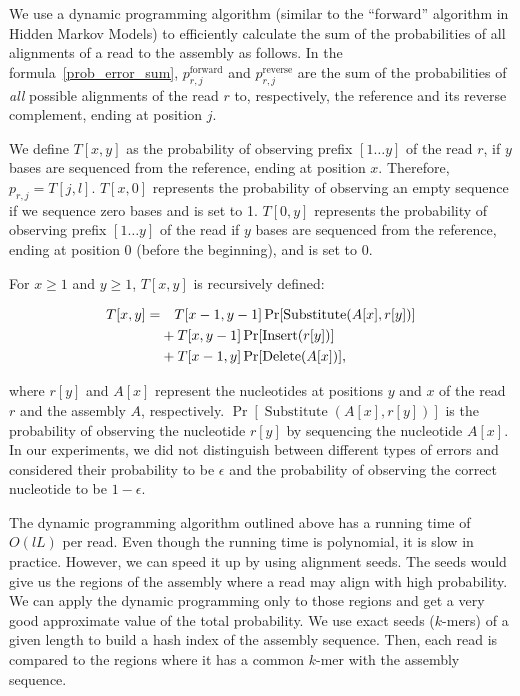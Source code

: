We use a dynamic programming algorithm (similar to the ``forward''
algorithm in Hidden Markov Models) to efficiently calculate the sum of the
probabilities of all alignments of a read to the assembly as follows.
In the formula~\eqref{prob_error_sum}, $p^{\text{forward}}_{r,j}$ and
$p^{\text{reverse}}_{r,j}$ are the sum of the probabilities
of \emph{all} possible alignments of the read $r$ to, respectively, the
reference and its reverse complement, ending at position $j$.

We define $T[x,y]$ as the probability of observing prefix $[1 \ldots
y]$ of the read $r$, if $y$ bases are sequenced from the reference, ending
at position $x$.  Therefore, $p_{r, j} = T[j, l]$. $T[x, 0]$ represents the probability of observing an empty sequence if
we sequence zero bases and is set to 1.  $T[0, y]$
represents the probability of observing prefix $[1 \ldots y]$ of the
read if $y$ bases are sequenced from the reference, ending at position
$0$ (before the beginning), and is set to 0.

For $x \geq 1$ and $y \geq 1$, $T[x, y]$ is recursively defined:

\begin{align}
\label{dp_single}
  T[x, y] = & \quad T[x - 1, y - 1] \Pr[\operatorname{Substitute}(A[x], r[y])]  \\
  & + T[x, y - 1]  \Pr[\operatorname{Insert}(r[y])]  \notag\\
  & + T[x - 1, y]  \Pr[\operatorname{Delete}(A[x])],  \notag
\end{align}

\noindent where $r[y]$ and $A[x]$ represent the nucleotides at positions $y$ and
$x$ of the read $r$ and the assembly $A$, respectively.
$\Pr[\operatorname{Substitute}(A[x], r[y])]$ is the probability of
observing the nucleotide $r[y]$ by sequencing the nucleotide $A[x]$.
In our experiments, we did not distinguish between
different types of errors and considered their probability to be
$\epsilon$ and the probability of observing the correct nucleotide to
be $1 - \epsilon$.

The dynamic programming algorithm outlined above has a running time of
$O(lL)$ per read.  Even though the running time is polynomial, it is
slow in practice.  However, we can speed it up by using alignment
seeds.  The seeds would give us the regions of the assembly where a
read may align with high probability.  We can apply the dynamic
programming only to those regions and get a very good approximate
value of the total probability.  We use exact seeds ($k$-mers) of a
given length to build a hash index of the assembly sequence.  Then,
each read is compared to the regions where it has a common $k$-mer
with the assembly sequence.

